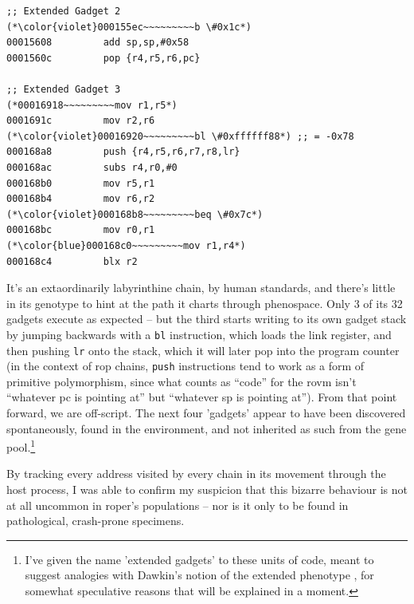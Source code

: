 \documentclass[12pt,glossary]{dalthesis}
\begin{document}
\begin{table}
\begin{multicols}{2}
\begin{lstlisting}[basicstyle=\scriptsize\ttfamily]
;; Extended Gadget 2 
(*\color{violet}000155ec~~~~~~~~~b \#0x1c*)
00015608         add sp,sp,#0x58 
0001560c         pop {r4,r5,r6,pc}

;; Extended Gadget 3 
(*00016918~~~~~~~~~mov r1,r5*) 
0001691c         mov r2,r6 
(*\color{violet}00016920~~~~~~~~~bl \#0xffffff88*) ;; = -0x78
000168a8         push {r4,r5,r6,r7,r8,lr} 
000168ac         subs r4,r0,#0 
000168b0         mov r5,r1 
000168b4         mov r6,r2 
(*\color{violet}000168b8~~~~~~~~~beq \#0x7c*)
000168bc         mov r0,r1 
(*\color{blue}000168c0~~~~~~~~~mov r1,r4*)
000168c4         blx r2
\end{lstlisting}
\end{multicols}
\caption{Execution trace of a chain that generates the register pattern required for a call to \texttt{execv("/bin/sh", ["/bin/sh"], NULL)} in \texttt{tomato-RT-N18U-httpd}, by modifying its own call stack and executing numerous "stray" or "extended" gadgets, in the \emph{Poclux} population. Modifications to the gadget stack are in red, jumps are in violet, and completion of target \gls{cpu} pattern is in blue. Free branches are separated by blank lines. The final instruction jumps to the designated stop address, \texttt{0x00000000}.}
\end{table} 

It's an extaordinarily labyrinthine chain, by human standards, and there's
 little in its genotype to hint at the path it charts through phenospace. Only 3
 of its 32 gadgets execute as expected -- but the third starts writing to its own
 gadget stack by jumping backwards with a \texttt{bl} instruction, which loads the link
 register, and then pushing \texttt{lr} onto the stack, which it will later pop into the
 program counter (in the context of \gls{rop} chains, \texttt{push} instructions tend to work
as a form of primitive polymorphism, since what counts as ``code'' for the \gls{rovm} 
isn't ``whatever \gls{pc} is pointing at'' but ``whatever \gls{sp} is pointing at''). From that point forward, we are off-script. The next four
 'gadgets' appear to have been discovered spontaneously, found in the
 environment, and not inherited as such from the gene pool.\footnote{I've given the name 'extended gadgets' to these units of code, meant to suggest
 analogies with Dawkin's notion of the extended phenotype \cite{dawkins99}, for
 somewhat speculative reasons that will be explained in a moment.}

By tracking every address visited by every chain in
its movement through the host process, I was able to confirm my suspicion
that this bizarre behaviour is not at all uncommon in \gls{roper}'s populations
-- nor is it only to be found in pathological, crash-prone specimens. 
\end{document}
